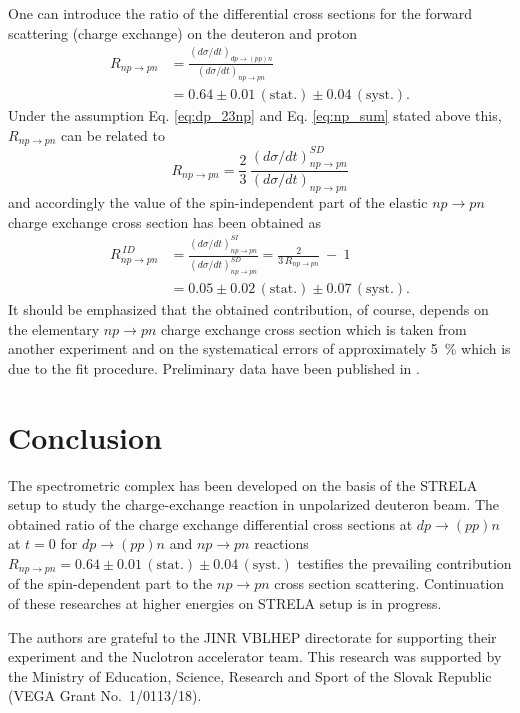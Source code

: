 \documentclass[twocolumn,epjc3]{svjour3}
\newcommand{\np}     {\ensuremath{np \rightarrow pn}\xspace}
\newcommand{\dpchex} {\ensuremath{dp \rightarrow (pp)n}\xspace}
\begin{document}
One can introduce the ratio of the differential cross sections for the forward
scattering (charge exchange) on the deuteron and proton
\begin{equation}
  \begin{split}
    R_{\np} &= \frac{(d\sigma/dt)_{\dpchex}}{(d\sigma/dt)_{\np}} \\
    &= 0.64 \pm 0.01\,\mathrm{(stat.)} \pm 0.04\,\mathrm{(syst.)}.
  \end{split}
\end{equation}
Under the assumption Eq. \eqref{eq:dp_23np} and Eq. \eqref{eq:np_sum} stated
above this, $R_{\np}$ can be related to
\begin{equation}
  R_{\np} = \frac{2}{3}\,\frac{(d\sigma/dt)^{SD}_{\np}}{(d\sigma/dt)_{\np}}
\end{equation}
and accordingly the value of the spin-independent part of the elastic \np charge
exchange cross section has been obtained as
\begin{equation}
  \begin{split}
    R^{\,ID}_{\np} &= \frac{(d\sigma/dt)^{SI}_{\np}}{(d\sigma/dt)^{SD}_{\np}}
    = \frac{2}{3\,R_{\np}} \ - \ 1 \\
    &= 0.05 \pm 0.02\,\mathrm{(stat.)} \pm 0.07\,\mathrm{(syst.)}.
  \end{split}
\end{equation}
It should be emphasized that the obtained contribution, of course, depends on
the elementary \np charge exchange cross section which is taken from another
experiment and on the systematical errors of approximately 5~\% which is due to
the fit procedure. Preliminary data have been published in \cite{bas14,bas16}.

\section{Conclusion}
The spectrometric complex has been developed on the basis of the STRELA setup to
study the charge-exchange reaction in unpolarized deuteron beam. The obtained
ratio of the charge exchange differential cross sections at \dpchex at $t=0$ for
\dpchex and \np reactions
$R_{\np} = 0.64 \pm 0.01\,\mathrm{(stat.)} \pm 0.04\,\mathrm{(syst.)}$ testifies
the prevailing contribution of the spin-dependent part to the \np cross section
scattering. Continuation of these researches at higher energies on STRELA setup
is in progress.

\begin{acknowledgements}
  The authors are grateful to the JINR VBLHEP directorate for supporting their
  experiment and the Nuclotron accelerator team. This research was supported by
  the Ministry of Education, Science, Research and Sport of the Slovak Republic
  (VEGA Grant No.~1/0113/18).
\end{acknowledgements}
\end{document}
